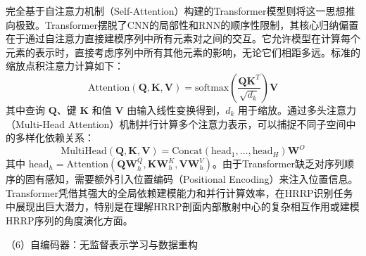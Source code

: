 完全基于自注意力机制（Self-Attention）构建的Transformer模型则将这一思想推向极致。Transformer摆脱了CNN的局部性和RNN的顺序性限制，其核心归纳偏置在于通过自注意力直接建模序列中所有元素对之间的交互。它允许模型在计算每个元素的表示时，直接考虑序列中所有其他元素的影响，无论它们相距多远。标准的缩放点积注意力计算如下：
\begin{equation}
    \text{Attention}(\mathbf{Q}, \mathbf{K}, \mathbf{V}) = \text{softmax}\left(\frac{\mathbf{Q}\mathbf{K}^T}{\sqrt{d_k}}\right)\mathbf{V}
    \label{eq:scaled_dot_product_attention_revised}
\end{equation}
其中查询 $\mathbf{Q}$、键 $\mathbf{K}$ 和值 $\mathbf{V}$ 由输入线性变换得到，$d_k$ 用于缩放。通过多头注意力（Multi-Head Attention）机制并行计算多个注意力表示，可以捕捉不同子空间中的多样化依赖关系：
\begin{equation}
    \text{MultiHead}(\mathbf{Q}, \mathbf{K}, \mathbf{V}) = \text{Concat}(\text{head}_1, \dots, \text{head}_H) \mathbf{W}^O
    \label{eq:multi_head_attention_revised}
\end{equation}
其中 $\text{head}_h = \text{Attention}(\mathbf{Q}\mathbf{W}_h^Q, \mathbf{K}\mathbf{W}_h^K, \mathbf{V}\mathbf{W}_h^V)$。由于Transformer缺乏对序列顺序的固有感知，需要额外引入位置编码（Positional Encoding）来注入位置信息。Transformer凭借其强大的全局依赖建模能力和并行计算效率，在HRRP识别任务中展现出巨大潜力，特别是在理解HRRP剖面内部散射中心的复杂相互作用或建模HRRP序列的角度演化方面。

（6）自编码器：无监督表示学习与数据重构

